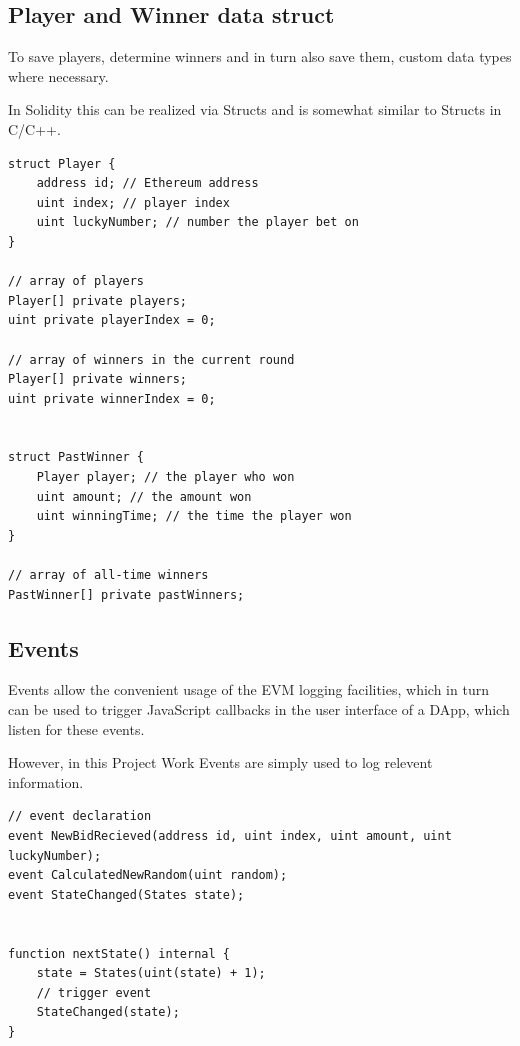 \subsection{Player and Winner data struct}\label{sec:structs}

To save players, determine winners and in turn also save them, custom data types where necessary.

In Solidity this can be realized via Structs and is somewhat similar to Structs in C/C++.

\begin{lstlisting}[language=Solidity]
struct Player {
    address id; // Ethereum address
    uint index; // player index
    uint luckyNumber; // number the player bet on
}

// array of players
Player[] private players;
uint private playerIndex = 0;

// array of winners in the current round
Player[] private winners;
uint private winnerIndex = 0;


struct PastWinner {
    Player player; // the player who won
    uint amount; // the amount won
    uint winningTime; // the time the player won
}

// array of all-time winners
PastWinner[] private pastWinners;
\end{lstlisting}


\subsection{Events}\label{sec:events}

Events allow the convenient usage of the \ac{EVM} logging facilities, which in turn can be used to trigger JavaScript callbacks in the user interface of a \ac{DApp}, which listen for these events.

However, in this Project Work Events are simply used to log relevent information.


\begin{lstlisting}[language=Solidity]
// event declaration
event NewBidRecieved(address id, uint index, uint amount, uint luckyNumber);
event CalculatedNewRandom(uint random);
event StateChanged(States state);


function nextState() internal {
    state = States(uint(state) + 1);
    // trigger event
    StateChanged(state);
}
\end{lstlisting}

